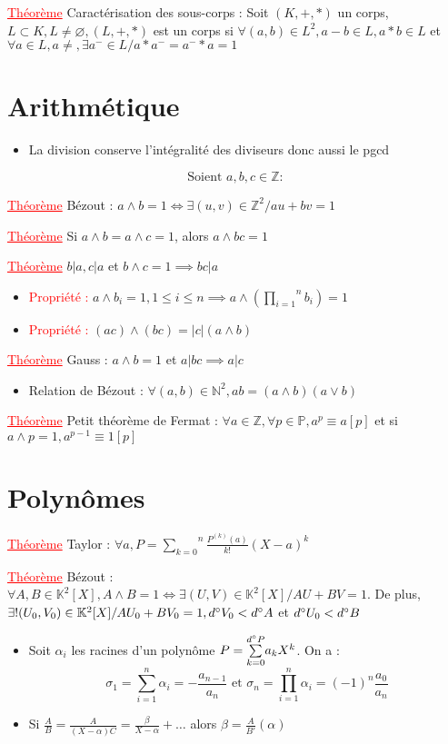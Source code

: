\documentclass[a4paper, french]{article}
\newcommand{\N}{\mathbb{N}}
\newcommand{\Z}{\mathbb{Z}}
\newcommand{\K}{\mathbb{K}}
\newcommand{\p}{\wedge}
\newcommand{\al}{\alpha}
\newcommand{\be}{\beta}
\newcommand{\si}{\sigma}
\newcommand{\som}[2]{\overset{#2}{\underset{#1}{\sum}}}
\newcommand{\produit}[2]{\overset{#2}{\underset{#1}{\prod}}}
\newcommand{\thm}{\textcolor{red}{\underline{Théorème} }}
\newcommand{\ppt}{\textcolor{red}{Propriété : }}
\begin{document}
	\thm Caractérisation des sous-corps : Soit $(K,+,*)$ un corps, $L \subset K, L\neq \varnothing, 
	  (L,+,*)$ est un corps si $\forall (a,b) \in L^2, a-b \in L, a*b \in L$ et $\forall a\in L, a\neq, \exists a^- \in L / a*a^-=a^-*a=1$

	\section{Arithmétique}
	\begin{itemize}[label=\(\bullet\)]
	  \item La division conserve l'intégralité des diviseurs donc aussi le pgcd
	\end{itemize}
	$$\text{Soient } a,b,c \in \Z :$$

	 \thm Bézout : $a \p b=1 \iff \exists (u,v) \in \Z^2 / au+bv=1$ 
	 
	 \thm Si $a \p b= a \p c = 1$, alors $a \p bc =1$ 
	 
	 \thm $b|a, c|a$ et $b\p c =1 \implies bc|a$
	\begin{itemize}[label=\(\bullet\)]
	  \item \ppt $a \p b_i=1, 1 \leqslant i \leqslant n \implies a\p (\produit{i=1}{n} b_i)=1$
	  \item \ppt $(ac)\p(bc)=|c|(a \p b)$
	\end{itemize}

	 \thm Gauss : $a \p b = 1$ et $a|bc \implies a|c$
	
	 \begin{itemize}[label=\(\bullet\)]
	  \item Relation de Bézout : $\forall (a,b) \in \N^2, ab=(a \p b)(a \vee b)$
	\end{itemize}

	 \thm Petit théorème de Fermat : $\forall a \in \Z, \forall p \in \mathbb{P}, a^p \equiv a[p]$ et si $a \p p=1, a^{p-1} \equiv 1[p]$

	\section{Polynômes}
	 \thm Taylor : $\forall a, P=\som{k=0}{n} \frac{P^{(k)}(a)}{k!}(X-a)^k$ 
	 
	 \thm Bézout : $\forall A,B \in \K^2[X], A \p B = 1 \iff \exists (U,V) \in \K^2[X] / AU+BV=1$. De plus, $\exists! (U_0,V_0) \in \K^2[X] / AU_0+BV_0=1,
		d \degree V_0 < d \degree A$ et $d \degree U_0 < d \degree B$
	\begin{itemize}[label=\(\bullet\)]
	  \item Soit $\al_i$ les racines d'un polynôme $P=\som{k=0}{d\degree P}a_kX^k$. On a :
			$$\si_1=\som{i=1}{n}\al_i=-\frac{a_{n-1}}{a_n} \text{ et } \si_n=\produit{i=1}{n}\al_i=(-1)^n\frac{a_0}{a_n}$$
	  \item Si $\frac{A}{B}=\frac{A}{(X-\al)C}=\frac{\be}{X-\al}+\dots$ alors $\be=\frac{A}{B'}(\al)$
	\end{itemize}
\end{document}
